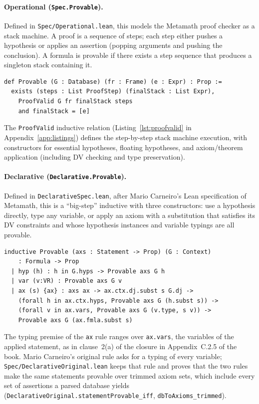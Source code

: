 \documentclass[11pt]{article}
\newcommand{\lean}[1]{\lstinline[language=Lean4]{#1}}
\newcommand{\file}[1]{\texttt{#1}}
\begin{document}
\paragraph{Operational (\texttt{Spec.Provable}).}
Defined in \file{Spec/Operational.lean}, this models the Metamath proof
checker as a stack machine.  A proof is a sequence of steps; each step
either pushes a hypothesis or applies an assertion (popping arguments
and pushing the conclusion).  A formula is provable if there exists a
step sequence that produces a singleton stack containing it.

\begin{lstlisting}[caption={Operational provability (\file{Spec/Operational.lean}).},label=lst:provable]
def Provable (G : Database) (fr : Frame) (e : Expr) : Prop :=
  exists (steps : List ProofStep) (finalStack : List Expr),
    ProofValid G fr finalStack steps
    and finalStack = [e]
\end{lstlisting}

The \lean{ProofValid} inductive relation (Listing~\ref{lst:proofvalid}
in Appendix~\ref{app:listings}) defines the step-by-step stack machine
execution, with constructors for essential hypotheses, floating
hypotheses, and axiom/theorem application (including DV checking and
type preservation).

\paragraph{Declarative (\texttt{Declarative.Provable}).}
Defined in \file{DeclarativeSpec.lean}, after Mario Carneiro's Lean
specification of Metamath, this is a ``big-step'' inductive with three
constructors: use a hypothesis directly, type any variable, or apply an
axiom with a substitution that satisfies its DV constraints and whose
hypothesis instances and variable typings are all provable.

\begin{lstlisting}[caption={Declarative provability (\file{DeclarativeSpec.lean}).},label=lst:semantic]
inductive Provable (axs : Statement -> Prop) (G : Context)
    : Formula -> Prop
  | hyp (h) : h in G.hyps -> Provable axs G h
  | var (v:VR) : Provable axs G v
  | ax (s) {ax} : axs ax -> ax.ctx.dj.subst s G.dj ->
    (forall h in ax.ctx.hyps, Provable axs G (h.subst s)) ->
    (forall v in ax.vars, Provable axs G (v.type, s v)) ->
    Provable axs G (ax.fmla.subst s)
\end{lstlisting}

The typing premise of the \lean{ax} rule ranges over \lean{ax.vars}, the
variables of the applied statement, as in clause~2(a) of the closure in
Appendix~C.2.5 of the book.  Mario Carneiro's original rule asks for a
typing of every variable; \file{Spec/DeclarativeOriginal.lean} keeps that
rule and proves that the two rules make the same statements provable over
trimmed axiom sets, which include every set of assertions a parsed
database yields (\lean{DeclarativeOriginal.statementProvable_iff},
\lean{dbToAxioms_trimmed}).
\end{document}
